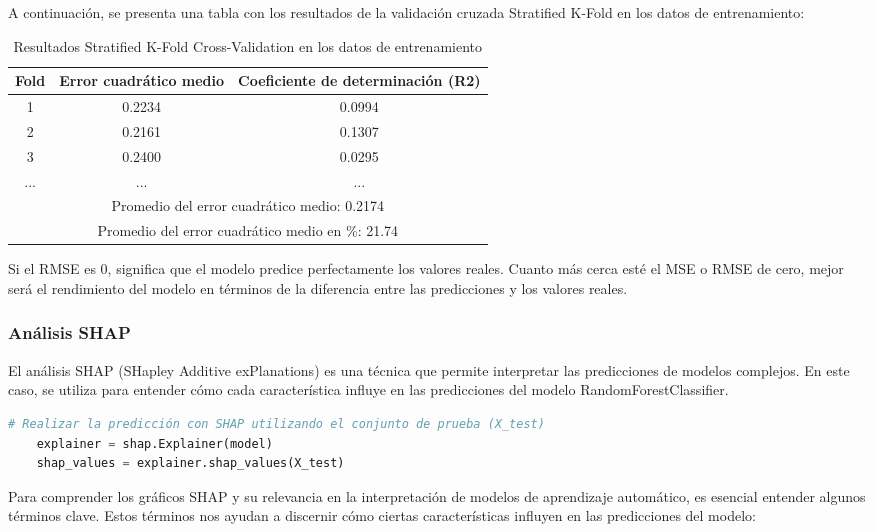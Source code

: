 A continuación, se presenta una tabla con los resultados de la validación cruzada Stratified K-Fold en los datos de entrenamiento:

\begin{table}[h]
\centering
\caption{Resultados Stratified K-Fold Cross-Validation en los datos de entrenamiento}
\label{lst:res_skfold_train}
\begin{tabular}{|c|c|c|}
\hline
\textbf{Fold} & \textbf{Error cuadrático medio} & \textbf{Coeficiente de determinación (R2)} \\
\hline
1 & 0.2234 & 0.0994 \\
2 & 0.2161 & 0.1307 \\
3 & 0.2400 & 0.0295 \\
... & ... & ... \\
\hline
\multicolumn{3}{|c|}{Promedio del error cuadrático medio: 0.2174} \\
\multicolumn{3}{|c|}{Promedio del error cuadrático medio en \%: 21.74} \\
\hline
\end{tabular}
\end{table}

Si el RMSE es 0, significa que el modelo predice perfectamente los valores reales. Cuanto más cerca esté el MSE o RMSE de cero, mejor será el rendimiento del modelo en términos de la diferencia entre las predicciones y los valores reales.


\subsubsection{Análisis SHAP}

El análisis SHAP (SHapley Additive exPlanations) es una técnica que permite interpretar las predicciones de modelos complejos. En este caso, se utiliza para entender cómo cada característica influye en las predicciones del modelo RandomForestClassifier.

\begin{lstlisting}[language=Python, caption=Predicción con SHAP utilizando el conjunto de prueba, label=lst:shap_analysis]
    # Realizar la predicción con SHAP utilizando el conjunto de prueba (X_test)
    explainer = shap.Explainer(model)
    shap_values = explainer.shap_values(X_test)
\end{lstlisting}


Para comprender los gráficos SHAP y su relevancia en la interpretación de modelos de aprendizaje automático, es esencial entender algunos términos clave. Estos términos nos ayudan a discernir cómo ciertas características influyen en las predicciones del modelo:

